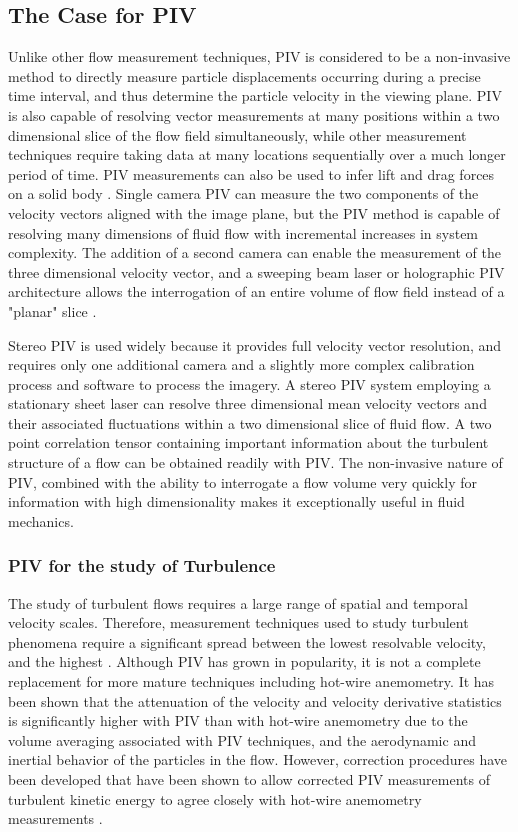  
\subsection{The Case for PIV}

Unlike other flow measurement techniques, PIV is considered to be a 
non-invasive method to directly measure particle displacements occurring during 
a precise time interval, and thus determine the particle velocity in the 
viewing plane. PIV is also capable 
of resolving vector measurements at many positions within a two dimensional 
slice of the flow field simultaneously, while other measurement techniques 
require taking data at many locations sequentially over a much longer period 
of time. PIV measurements can also be used to infer lift and drag forces on a 
solid body \cite{noca1997}. Single camera PIV can measure the two components of 
the velocity vectors aligned with the image plane, but the PIV method is 
capable of resolving many dimensions of fluid flow with incremental increases 
in system complexity. The addition of a second camera can enable the 
measurement of the three dimensional velocity vector, and a sweeping beam laser 
or holographic PIV architecture allows the interrogation of an entire volume of 
flow field instead of a "planar" slice 
\cite{barnhart1994,elsinga2006,kahler2000}.

Stereo PIV is used widely because it provides full velocity vector resolution, 
and requires only one additional camera and a slightly more complex 
calibration process and software to process the imagery. A stereo PIV system 
employing a  stationary sheet laser can resolve three dimensional mean velocity 
vectors and their associated fluctuations within a two dimensional slice of 
fluid flow. A 
two point correlation tensor containing important information about the 
turbulent structure of a flow can be obtained readily with PIV. The 
non-invasive nature of PIV, combined with the  ability to interrogate a flow 
volume very quickly for information with high dimensionality makes it 
exceptionally useful in fluid mechanics. \cite{adrian1991}

\subsubsection{PIV for the study of Turbulence}
The study of turbulent flows requires a large range of spatial and temporal 
velocity scales. Therefore, measurement techniques used to study turbulent 
phenomena require a significant spread between the lowest resolvable velocity, 
and the highest \cite{barnhart1994}. Although PIV has grown in popularity, it 
is not a complete replacement for more mature techniques including hot-wire 
anemometry. 
It has been shown that the attenuation of the velocity and velocity derivative 
statistics is significantly higher with PIV than with hot-wire anemometry due 
to the volume averaging associated with PIV techniques, and the aerodynamic and 
inertial behavior of the particles in the flow.
However, correction procedures have been developed that have been shown to 
allow corrected PIV measurements of turbulent kinetic energy to agree closely 
with hot-wire anemometry measurements \cite{lavoie2007,kasagi1991}. 

